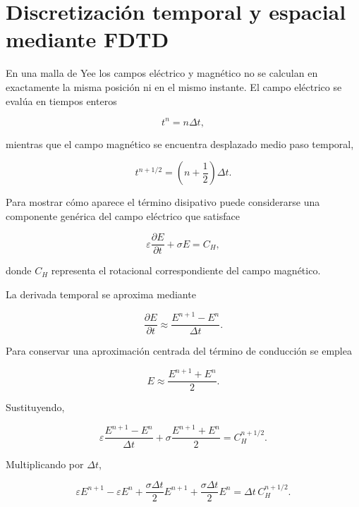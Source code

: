 \section{Discretización temporal y espacial mediante FDTD}

En una malla de Yee los campos eléctrico y magnético no se calculan en exactamente la misma posición ni en el mismo instante. El campo eléctrico se evalúa en tiempos enteros

\begin{equation}
t^n=n\Delta t,
\end{equation}

mientras que el campo magnético se encuentra desplazado medio paso temporal,

\begin{equation}
t^{n+1/2}
=
\left(
n+\frac{1}{2}
\right)\Delta t.
\end{equation}

Para mostrar cómo aparece el término disipativo puede considerarse una componente genérica del campo eléctrico que satisface

\begin{equation}
\varepsilon
\frac{\partial E}{\partial t}
+
\sigma E
=
C_H,
\end{equation}

donde $C_H$ representa el rotacional correspondiente del campo magnético.

La derivada temporal se aproxima mediante

\begin{equation}
\frac{\partial E}{\partial t}
\approx
\frac{E^{n+1}-E^n}{\Delta t}.
\end{equation}

Para conservar una aproximación centrada del término de conducción se emplea

\begin{equation}
E
\approx
\frac{E^{n+1}+E^n}{2}.
\end{equation}

Sustituyendo,

\begin{equation}
\varepsilon
\frac{E^{n+1}-E^n}{\Delta t}
+
\sigma
\frac{E^{n+1}+E^n}{2}
=
C_H^{n+1/2}.
\end{equation}

Multiplicando por $\Delta t$,

\begin{equation}
\varepsilon E^{n+1}
-
\varepsilon E^n
+
\frac{\sigma\Delta t}{2}E^{n+1}
+
\frac{\sigma\Delta t}{2}E^n
=
\Delta t\,C_H^{n+1/2}.
\end{equation}

